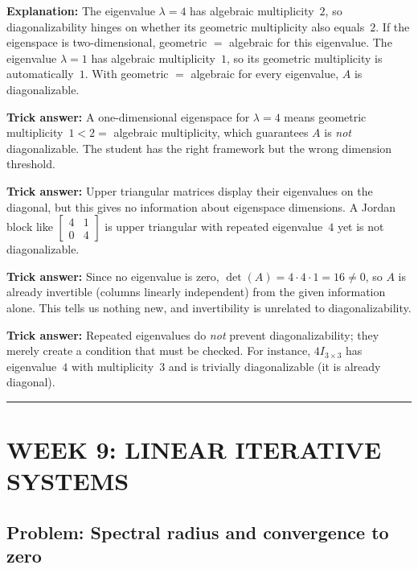 \documentclass[12pt]{amsart}
\newcommand{\divider}{
  \vspace{-1em}
  \noindent
  \raisebox{-0.15ex}{\textbullet}%
  \hspace{0.5em}%
  \rule[0.5ex]{0.95\textwidth}{1.0pt}%
  \hspace{0.5em}%
  \raisebox{-0.15ex}{\textbullet}%
  \vspace{0em}
}
\begin{document}
\textbf{Explanation:}
The eigenvalue $\lambda = 4$ has algebraic multiplicity~$2$, so
diagonalizability hinges on whether its geometric multiplicity also
equals~$2$. If the eigenspace is two-dimensional, geometric $=$
algebraic for this eigenvalue. The eigenvalue $\lambda = 1$ has
algebraic multiplicity~$1$, so its geometric multiplicity is
automatically~$1$. With geometric $=$ algebraic for every eigenvalue,
$A$ is diagonalizable.

\textbf{Trick answer:}
A one-dimensional eigenspace for $\lambda = 4$ means geometric
multiplicity~$1 < 2 =$ algebraic multiplicity, which guarantees
$A$ is \emph{not} diagonalizable. The student has the right framework
but the wrong dimension threshold.

\textbf{Trick answer:}
Upper triangular matrices display their eigenvalues on the diagonal,
but this gives no information about eigenspace dimensions. A Jordan block
like $\begin{bmatrix} 4 & 1 \\ 0 & 4 \end{bmatrix}$ is upper triangular
with repeated eigenvalue~$4$ yet is not diagonalizable.

\textbf{Trick answer:}
Since no eigenvalue is zero,
$\det(A) = 4 \cdot 4 \cdot 1 = 16 \neq 0$, so $A$ is already
invertible (columns linearly independent) from the given information
alone. This tells us nothing new, and invertibility is unrelated to
diagonalizability.

\textbf{Trick answer:}
Repeated eigenvalues do \emph{not} prevent diagonalizability; they
merely create a condition that must be checked. For instance,
$4I_{3 \times 3}$ has eigenvalue~$4$ with multiplicity~$3$ and is
trivially diagonalizable (it is already diagonal).

\divider

\newpage

\section*{WEEK 9: LINEAR ITERATIVE SYSTEMS}

\subsection*{Problem: Spectral radius and convergence to zero}
\end{document}
